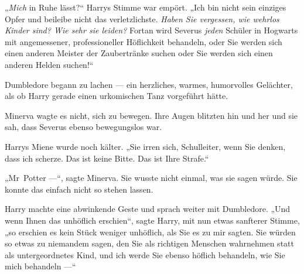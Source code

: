 „\emph{Mich} in Ruhe lässt?“ Harrys Stimme war empört.
„Ich bin nicht sein einziges Opfer und beileibe nicht das verletzlichste. \emph{Haben Sie vergessen, wie wehrlos Kinder sind? Wie sehr sie leiden?} Fortan wird Severus \emph{jeden} Schüler in Hogwarts mit angemessener, professioneller Höflichkeit behandeln, oder Sie werden sich einen anderen Meister der Zaubertränke suchen oder Sie werden sich einen anderen Helden suchen!“

Dumbledore begann zu lachen — ein herzliches, warmes, humorvolles Gelächter, als ob Harry gerade einen urkomischen Tanz vorgeführt hätte.

Minerva wagte es nicht, sich zu bewegen. Ihre Augen blitzten hin und her und sie sah, dass Severus ebenso bewegungslos war.

Harrys Miene wurde noch kälter.
„Sie irren sich, Schulleiter, wenn Sie denken, dass ich scherze. Das ist keine Bitte. Das ist Ihre Strafe.“

„Mr~Potter —“, sagte Minerva. Sie wusste nicht einmal, was sie sagen würde. Sie konnte das einfach nicht so stehen lassen.

Harry machte eine abwinkende Geste und sprach weiter mit Dumbledore.
„Und wenn Ihnen das unhöflich erschien“, sagte Harry, mit nun etwas sanfterer Stimme, „so erschien es kein Stück weniger unhöflich, als Sie es zu mir sagten. Sie würden so etwas zu niemandem sagen, den Sie als richtigen Menschen wahrnehmen statt als untergeordnetes Kind, und ich werde Sie ebenso höflich behandeln, wie Sie mich behandeln —“

